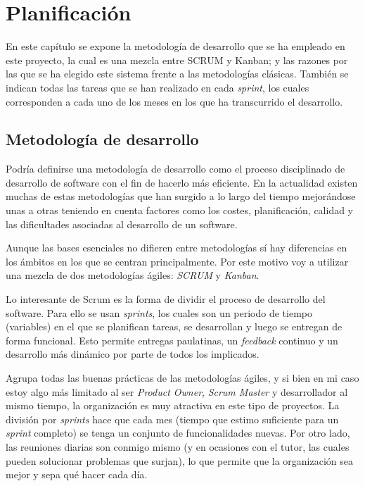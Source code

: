 \chapter{Planificación}

En este capítulo se expone la metodología de desarrollo que se ha empleado en este proyecto, la cual es una mezcla entre SCRUM y Kanban; y las razones por las que se ha elegido este sistema frente a las metodologías clásicas. También se indican todas las tareas que se han realizado en cada \textit{sprint}, los cuales corresponden a cada uno de los meses en los que ha transcurrido el desarrollo.

\section{Metodología de desarrollo}

Podría definirse una metodología de desarrollo como el proceso disciplinado de desarrollo de software con el fin de hacerlo más eficiente. En la actualidad existen muchas de estas metodologías que han surgido a lo largo del tiempo mejorándose unas a otras teniendo en cuenta factores como los costes, planificación, calidad y las dificultades asociadas al desarrollo de un software.

Aunque las bases esenciales no difieren entre metodologías sí hay diferencias en los ámbitos en los que se centran principalmente. Por este motivo voy a utilizar una mezcla de dos metodologías ágiles: \textit{SCRUM} y \textit{Kanban}.

Lo interesante de Scrum es la forma de dividir el proceso de desarrollo del software. Para ello se usan \textit{sprints}, los cuales son un periodo de tiempo (variables) en el que se planifican tareas, se desarrollan y luego se entregan de forma funcional. Esto permite entregas paulatinas, un \textit{feedback} continuo y un desarrollo más dinámico por parte de todos los implicados.

Agrupa todas las buenas prácticas de las metodologías ágiles, y si bien en mi caso estoy algo más limitado al ser \textit{Product Owner}, \textit{Scrum Master} y desarrollador al mismo tiempo, la organización es muy atractiva en este tipo de proyectos. La división por \textit{sprints} hace que cada mes (tiempo que estimo suficiente para un \textit{sprint} completo) se tenga un conjunto de funcionalidades nuevas. Por otro lado, las reuniones diarias son conmigo mismo (y en ocasiones con el tutor, las cuales pueden solucionar problemas que surjan), lo que permite que la organización sea mejor y sepa qué hacer cada día.

